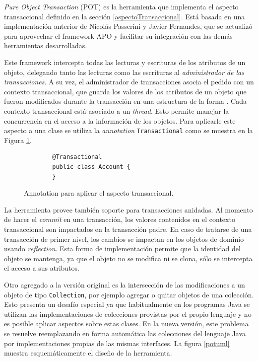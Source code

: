 \emph{Pure Object Transaction} (POT) es la herramienta que implementa el
aspecto transaccional definido en la sección \ref{aspectoTransaccional}.
Está basada en una implementación anterior de Nicolás Passerini y Javier
Fernandes, que se actualizó para aprovechar el framework APO y facilitar su
integración con las demás herramientas desarrolladas.

\medskip
 
Este framework intercepta todas las lecturas y escrituras de los atributos de
un objeto, delegando tanto las lecturas como las escrituras al
\emph{administrador de las transacciones}.
A su vez, el administrador de transacciones asocia el pedido con un contexto
transaccional, que guarda los valores de los atributos de un objeto que fueron
modificados durante la transacción en una estructura de la forma
.
Cada contexto transaccional está asociado a un \emph{thread}. Esto
permite manejar la concurrencia en el acceso a la información de los objetos.
Para aplicarle este aspecto a una clase se utiliza la \emph{annotation} \lstinline|Transactional| como
se muestra en la Figura \ref{annoTransactional}.

\begin{figure}[hbt]
	\begin{lstlisting} 
		@Transactional
		public class Account {
		}
	\end{lstlisting}
	\caption{Annotation para aplicar el aspecto transaccional.}
	\label{annoTransactional}
\end{figure}
	
\medskip
 
La herramienta provee también soporte para transacciones anidadas.
Al momento de hacer el \emph{commit} en una transacción, los valores
contenidos en el contexto transaccional son impactados en la transacción
padre.
En caso de tratarse de una transacción de primer nivel, los cambios se impactan
en los objetos de dominio usando \emph{reflection}.
Esta forma de implementación permite que la identidad del objeto se
mantenga, ya que el objeto no se modifica ni se clona, sólo se intercepta el
acceso a sus atributos.

Otro agregado a la versión original es la intersección de las modificaciones 
a un objeto de tipo \lstinline|Collection|, por ejemplo agregar o quitar
objetos de una colección.
Esto presenta un desafío especial ya que habitualmente en los programas Java
se utilizan las implementaciones de colecciones provistas por el propio
lenguaje y no es posible aplicar aspectos sobre estas clases. 
En la nueva versión, este problema se resuelve reemplazando en forma
automática las colecciones del lenguaje Java por
implementaciones propias de las mismas interfaces.
La figura \ref{potuml} muestra esquemáticamente el diseño de la herramienta.

